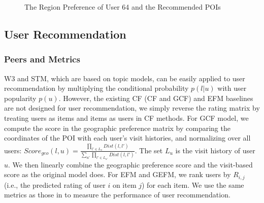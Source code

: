 \begin{figure}[th]
\centering
{}
\caption{The Region Preference of User 64 and the Recommended POIs}
\label{fig:user64}
\end{figure}


\subsection{User Recommendation}
\label{sec:userrec}
\subsubsection{Peers and Metrics}
W3 and STM,
which are based on topic models, can be easily applied
to user recommendation
by multiplying the conditional probability
$p(l|u)$ with user popularity $p(u)$.
However, the existing CF (CF and GCF) and EFM
baselines are not designed for
user recommendation, we simply reverse the rating matrix
by treating users as items and items as users in CF methods.
For GCF model, we compute the score in the geographic preference
matrix by comparing the coordinates of the POI with each
user's visit histories, and normalizing over all users:
$
Score_{geo}(l,u)=\frac{\prod_{l'\in L_u}{Dist(l,l')}}{\sum_{u'}{\prod_{l'\in L_{u'}}{Dist(l,l')}}}.
$
The set $L_u$ is the visit history of user $u$. We then linearly
combine the geographic preference score and the visit-based score
as the original model does.
For EFM and GEFM, we rank users by $R_{i,j}$ (i.e., the predicted
rating of user $i$ on item $j$) for each item.
We use the same metrics as those in
 to measure the performance of user recommendation.

